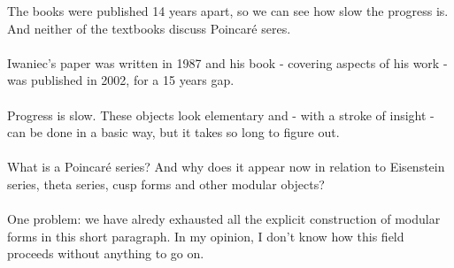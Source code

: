 \documentclass[12pt]{article}
\begin{document}
The books were published 14 years apart, so we can see how slow the progress is.  And neither of the textbooks discuss Poincar\'{e} seres.  \\\\
Iwaniec's paper was written in 1987 and his book - covering aspects of his work - was published in 2002, for a 15 years gap. \\ \\
Progress is slow.  These objects look elementary and - with a stroke of insight - can be done in a basic way, but it takes so long to figure out.  \\ \\
What is a Poincar\'{e} series?  And why does it appear now in relation to Eisenstein series, theta series, cusp forms and other modular objects? \\ \\
One problem: {\color{orange!50!black!50!green} we have alredy exhausted all the explicit construction of modular forms in this short paragraph}.  In my opinion, I don't know how this field proceeds without anything to go on.

\newpage
\end{document}
